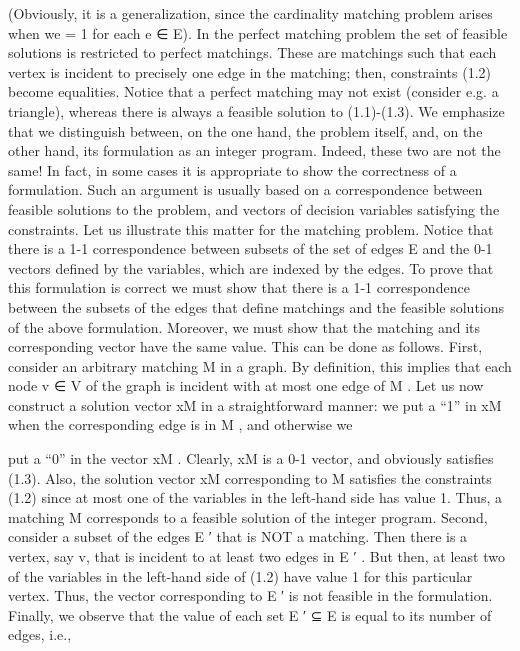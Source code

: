 \documentclass[titlepage]{book}
\begin{document}
(Obviously, it is a generalization, since the cardinality matching problem arises when we = 1 for each e ∈ E). In
the perfect matching problem the set of feasible solutions is restricted to perfect matchings. These are
matchings such that each vertex is incident to precisely one edge in the matching; then, constraints (1.2)
become equalities. Notice that a perfect matching may not exist (consider e.g. a triangle), whereas there
is always a feasible solution to (1.1)-(1.3). %
We emphasize that we distinguish between, on the one hand, the problem itself, and, on the other hand,
its formulation as an integer program. Indeed, these two are not the same! In fact, in some cases
it is appropriate to show the correctness of a formulation. Such an argument is usually based on a
correspondence between feasible solutions to the problem, and vectors of decision variables satisfying the
constraints.
Let us illustrate this matter for the matching problem. Notice that there is a 1-1 correspondence between
subsets of the set of edges E and the 0-1 vectors defined by the variables, which are indexed by the edges.
To prove that this formulation is correct we must show that there is a 1-1 correspondence between the
subsets of the edges that define matchings and the feasible solutions of the above formulation. Moreover,
we must show that the matching and its corresponding vector have the same value. This can be done as
follows. First, consider an arbitrary matching M in a graph. By definition, this implies that each node
v ∈ V of the graph is incident with at most one edge of M . Let us now construct a solution vector xM in
a straightforward manner: we put a “1” in xM when the corresponding edge is in M , and otherwise we

put a “0” in the vector xM . Clearly, xM is a 0-1 vector, and obviously satisfies (1.3). Also, the solution
vector xM corresponding to M satisfies the constraints (1.2) since at most one of the variables in the
left-hand side has value 1. Thus, a matching M corresponds to a feasible solution of the integer program.
Second, consider a subset of the edges E ′ that is NOT a matching. Then there is a vertex, say v, that
is incident to at least two edges in E ′ . But then, at least two of the variables in the left-hand side of
(1.2) have value 1 for this particular vertex. Thus, the vector corresponding to E ′ is not feasible in the
formulation. Finally, we observe that the value of each set E ′ ⊆ E is equal to its number of edges, i.e.,

\end{document}
